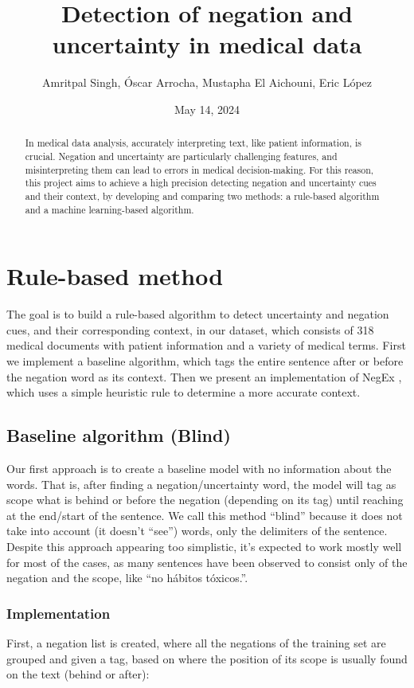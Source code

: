 \documentclass{article}
\begin{document}
\title{Detection of negation and uncertainty in medical data}
\author{Amritpal Singh, Óscar Arrocha, Mustapha El Aichouni, Eric López}
\date{May 14, 2024}
\maketitle

\begin{abstract}
	In medical data analysis, accurately interpreting text, like patient information, is crucial.
	Negation and uncertainty are particularly challenging features, and misinterpreting them can
	lead to errors in medical decision-making. For this reason, this project aims to achieve a high
	precision detecting negation and uncertainty cues and their context, by developing and comparing
	two methods: a rule-based algorithm and a machine learning-based algorithm.
\end{abstract}

\section*{Rule-based method}
The goal is to build a rule-based algorithm to detect uncertainty and negation cues, and their
corresponding context, in our dataset, which consists of 318 medical documents with patient information
and a variety of medical terms. First we implement a baseline algorithm, which tags the entire sentence
after or before the negation word as its context. Then we present an implementation of NegEx \cite{negex},
which uses a simple heuristic rule to determine a more accurate context.

\subsection*{Baseline algorithm (Blind)}
Our first approach is to create a baseline model with no information about the words. That is, after
finding a negation/uncertainty word, the model will tag as scope what is behind or before the negation
(depending on its tag) until reaching at the end/start of the sentence. We call this method “blind”
because it does not take into account (it doesn’t “see”) words, only the delimiters of the sentence.
Despite this approach appearing too simplistic, it’s expected to work mostly well for most of the cases,
as many sentences have been observed to consist only of the negation and the scope, like “no hábitos tóxicos.”.

\subsubsection*{Implementation}
First, a negation list is created, where all the negations of the training set are grouped and given a tag,
based on where the position of its scope is usually found on the text (behind or after):
\end{document}
